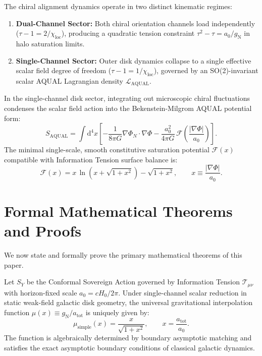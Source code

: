 \documentclass[11pt]{article}
\theoremstyle{definition}
\theoremstyle{remark}
\newcommand{\dd}{\mathrm{d}}
\begin{document}
\begin{definition}
The chiral alignment dynamics operate in two distinct kinematic regimes:
\begin{enumerate}
    \item \textbf{Dual-Channel Sector:} Both chiral orientation channels load independently ($\tau - 1 = 2/\chi_{\text{loc}}$), producing a quadratic tension constraint $\tau^2 - \tau = a_0 / g_{\text{N}}$ in halo saturation limits.
    \item \textbf{Single-Channel Sector:} Outer disk dynamics collapse to a single effective scalar field degree of freedom ($\tau - 1 = 1/\chi_{\text{loc}}$), governed by an SO(2)-invariant scalar AQUAL Lagrangian density $\mathcal{L}_{\text{AQUAL}}$.
\end{enumerate}
\end{definition}

In the single-channel disk sector, integrating out microscopic chiral fluctuations condenses the scalar field action into the Bekenstein-Milgrom AQUAL potential form:
\begin{equation}
S_{\text{AQUAL}} = \int \dd^4x \left[ -\frac{1}{8\pi G} \nabla \Phi_N \cdot \nabla \Phi - \frac{a_0^2}{4\pi G} \, \mathcal{F}\left( \frac{|\nabla \Phi|}{a_0} \right) \right].
\end{equation}
The minimal single-scale, smooth constitutive saturation potential $\mathcal{F}(x)$ compatible with Information Tension surface balance is:
\begin{equation}
\mathcal{F}(x) = x \, \ln\left(x + \sqrt{1+x^2}\right) - \sqrt{1+x^2}, \qquad x \equiv \frac{|\nabla \Phi|}{a_0}.
\end{equation}

\section{Formal Mathematical Theorems and Proofs}

We now state and formally prove the primary mathematical theorems of this paper.

\begin{theorem}
Let $S_Y$ be the Conformal Sovereign Action governed by Information Tension $\mathcal{T}_{\mu\nu}$ with horizon-fixed scale $a_0 = c H_0 / 2\pi$. Under single-channel scalar reduction in static weak-field galactic disk geometry, the universal gravitational interpolation function $\mu(x) \equiv g_{\text{N}} / a_{\text{tot}}$ is uniquely given by:
\begin{equation}
\mu_{\text{simple}}(x) = \frac{x}{\sqrt{1+x^2}}, \qquad x = \frac{a_{\text{tot}}}{a_0}.
\end{equation}
The function is algebraically determined by boundary asymptotic matching and satisfies the exact asymptotic boundary conditions of classical galactic dynamics.
\end{theorem}
\end{document}
